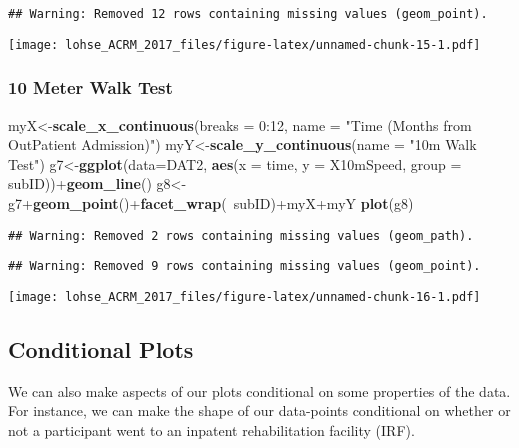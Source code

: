 \documentclass[]{article}
\newenvironment{Shaded}{\begin{snugshade}}{\end{snugshade}}
\newcommand{\KeywordTok}[1]{\textcolor[rgb]{0.13,0.29,0.53}{\textbf{{#1}}}}
\newcommand{\DataTypeTok}[1]{\textcolor[rgb]{0.13,0.29,0.53}{{#1}}}
\newcommand{\DecValTok}[1]{\textcolor[rgb]{0.00,0.00,0.81}{{#1}}}
\newcommand{\StringTok}[1]{\textcolor[rgb]{0.31,0.60,0.02}{{#1}}}
\newcommand{\NormalTok}[1]{{#1}}
\begin{document}
\begin{verbatim}
## Warning: Removed 12 rows containing missing values (geom_point).
\end{verbatim}

\texttt{[image: lohse\_ACRM\_2017\_files/figure-latex/unnamed-chunk-15-1.pdf]}

\newpage

\subsubsection{10 Meter Walk Test}\label{meter-walk-test-1}

\begin{Shaded}
\begin{Highlighting}[]
\NormalTok{myX<-}\KeywordTok{scale_x_continuous}\NormalTok{(}\DataTypeTok{breaks =} \DecValTok{0}\NormalTok{:}\DecValTok{12}\NormalTok{, }
                        \DataTypeTok{name =} \StringTok{"Time (Months from OutPatient Admission)"}\NormalTok{)}
\NormalTok{myY<-}\KeywordTok{scale_y_continuous}\NormalTok{(}\DataTypeTok{name =} \StringTok{"10m Walk Test"}\NormalTok{)}
\NormalTok{g7<-}\KeywordTok{ggplot}\NormalTok{(}\DataTypeTok{data=}\NormalTok{DAT2, }\KeywordTok{aes}\NormalTok{(}\DataTypeTok{x =} \NormalTok{time, }\DataTypeTok{y =} \NormalTok{X10mSpeed, }\DataTypeTok{group =} \NormalTok{subID))+}\KeywordTok{geom_line}\NormalTok{()}
\NormalTok{g8<-g7+}\KeywordTok{geom_point}\NormalTok{()+}\KeywordTok{facet_wrap}\NormalTok{(~subID)+myX+myY}
\KeywordTok{plot}\NormalTok{(g8)}
\end{Highlighting}
\end{Shaded}

\begin{verbatim}
## Warning: Removed 2 rows containing missing values (geom_path).
\end{verbatim}

\begin{verbatim}
## Warning: Removed 9 rows containing missing values (geom_point).
\end{verbatim}

\texttt{[image: lohse\_ACRM\_2017\_files/figure-latex/unnamed-chunk-16-1.pdf]}

\newpage

\subsection{Conditional Plots}\label{conditional-plots}

We can also make aspects of our plots conditional on some properties of
the data. For instance, we can make the shape of our data-points
conditional on whether or not a participant went to an inpatent
rehabilitation facility (IRF).
\end{document}
